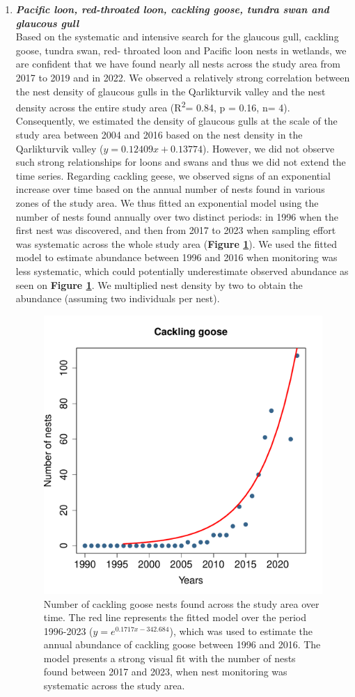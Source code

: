 \documentclass[a4paper,twoside,12pt]{article}
\begin{document}
        \begin{enumerate}[label=\alph*.]       
     \item[] \textit{\textbf{Pacific loon, red-throated loon, cackling goose, tundra swan and glaucous gull}}   \\
Based on the systematic and intensive search for the glaucous gull, cackling goose, tundra swan, red- throated loon and Pacific loon nests in wetlands, we are confident that we have found nearly all nests across the study area from 2017 to 2019 and in 2022. We observed a relatively strong correlation between the nest density of glaucous gulls in the Qarlikturvik valley and the nest density across the entire study area (R\textsuperscript{2}= 0.84, p = 0.16, n= 4). Consequently, we estimated the density of glaucous gulls at the scale of the study area between 2004 and 2016 based on the nest density in the Qarlikturvik valley ($y = 0.12409x + 0.13774$). However, we did not observe such strong relationships for loons and swans and thus we did not extend the time series. Regarding cackling geese, we observed signs of an exponential increase over time based on the annual number of nests found in various zones of the study area. We thus fitted an exponential model using the number of nests found annually over two distinct periods: in 1996 when the first nest was discovered, and then from 2017 to 2023 when sampling effort was systematic across the whole study area (\textbf{Figure \ref{figure:cackling}}). We used the fitted model to estimate abundance between 1996 and 2016 when monitoring was less systematic, which could potentially underestimate observed abundance as seen on \textbf{Figure \ref{figure:cackling}}. We multiplied nest density by two to obtain the abundance (assuming two individuals per nest). 

\begin{figure}[h]
\centering
\includegraphics[width=0.6\linewidth]{figures/cackling_goose_nest_exponential.pdf} 
\caption{Number of cackling goose nests found across the study area over time. The red line represents the fitted model over the period 1996-2023 ($y= e^{0.1717x-342.684}$), which was used to estimate the annual abundance of cackling goose between 1996 and 2016. The model presents a strong visual fit with the number of nests found between 2017 and 2023, when nest monitoring was systematic across the study area.}
\label{figure:cackling}
\end{figure}


\end{enumerate}
\end{document}
